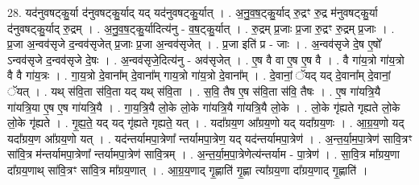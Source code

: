 \documentclass[17pt]{extarticle}
\begin{document}
28. यद॑नुवषट्कु॒र्या द॑नुवषट्कु॒र्याद् यद् यद॑नुवषट्कु॒र्यात् । . अ॒नु॒व॒ष॒ट्कु॒र्याद् रु॒द्रꣳ रु॒द्र म॑नुवषट्कु॒र्या द॑नुवषट्कु॒र्याद् रु॒द्रम् । . अ॒नु॒व॒ष॒ट्कु॒र्यादित्य॑नु - व॒ष॒ट्कु॒र्यात् । . रु॒द्रम् प्र॒जाः प्र॒जा रु॒द्रꣳ रु॒द्रम् प्र॒जाः । . प्र॒जा अ॒न्वव॑सृजे द॒न्वव॑सृजेत् प्र॒जाः प्र॒जा अ॒न्वव॑सृजेत् । . प्र॒जा इति॑ प्र - जाः । . अ॒न्वव॑सृजे दे॒ष ए॒षो᳚ ऽन्वव॑सृजे द॒न्वव॑सृजे दे॒षः । . अ॒न्वव॑सृजे॒दित्य॑नु - अव॑सृजेत् । . ए॒ष वै वा ए॒ष ए॒ष वै । . वै गा॑य॒त्रो गा॑य॒त्रो वै वै गा॑य॒त्रः । . गा॒य॒त्रो दे॒वाना᳚म् दे॒वाना᳚म् गाय॒त्रो गा॑य॒त्रो दे॒वाना᳚म् । . दे॒वानां॒ ॅयद् यद् दे॒वाना᳚म् दे॒वानां॒ ॅयत् । . यथ् स॑वि॒ता स॑वि॒ता यद् यथ् स॑वि॒ता । . स॒वि॒ तैष ए॒ष स॑वि॒ता स॑वि॒ तैषः । . ए॒ष गा॑यत्रि॒यै गा॑यत्रि॒या ए॒ष ए॒ष गा॑यत्रि॒यै । . गा॒य॒त्रि॒यै लो॒के लो॒के गा॑यत्रि॒यै गा॑यत्रि॒यै लो॒के । . लो॒के गृ॑ह्यते गृह्यते लो॒के लो॒के गृ॑ह्यते । . गृ॒ह्य॒ते॒ यद् यद् गृ॑ह्यते गृह्यते॒ यत् । . यदा᳚ग्रय॒ण आ᳚ग्रय॒णो यद् यदा᳚ग्रय॒णः । . आ॒ग्र॒य॒णो यद् यदा᳚ग्रय॒ण आ᳚ग्रय॒णो यत् । . यद॑न्तर्यामपा॒त्रेणा᳚ न्तर्यामपा॒त्रेण॒ यद् यद॑न्तर्यामपा॒त्रेण॑ । . अ॒न्त॒र्या॒म॒पा॒त्रेण॑ सावि॒त्रꣳ सा॑वि॒त्र म॑न्तर्यामपा॒त्रेणा᳚ न्तर्यामपा॒त्रेण॑ सावि॒त्रम् । . अ॒न्त॒र्या॒म॒पा॒त्रेणेत्य॑न्तर्याम - पा॒त्रेण॑ । . सा॒वि॒त्र मा᳚ग्रय॒णा दा᳚ग्रय॒णाथ् सा॑वि॒त्रꣳ सा॑वि॒त्र मा᳚ग्रय॒णात् । . आ॒ग्र॒य॒णाद् गृ॒ह्णाति॑ गृ॒ह्णा त्या᳚ग्रय॒णा दा᳚ग्रय॒णाद् गृ॒ह्णाति॑ । \newline
\end{document}
